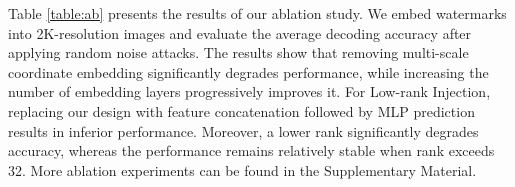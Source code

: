 \documentclass{article}
\begin{document}
Table \ref{table:ab} presents the results of our ablation study. We embed watermarks into 2K-resolution images and evaluate the average decoding accuracy after applying random noise attacks. The results show that removing multi-scale coordinate embedding significantly degrades performance, while increasing the number of embedding layers progressively improves it. For Low-rank Injection, replacing our design with feature concatenation followed by MLP prediction results in inferior performance. Moreover, a lower rank significantly degrades accuracy, whereas the performance remains relatively stable when rank exceeds 32. More ablation experiments can be found in the Supplementary Material.


\begin{table}[]
    \centering
\renewcommand\arraystretch{1.2}
\caption{Model performance with different components. Here, "\faTimes" indicates the absence of the corresponding component. For Coordinates Embedding, this means that only the Coordinate Fourier Mapper is used as an embedding feature. For Low-rank Injection, it signifies that features are concatenated and directly predicted by an MLP.}
\label{table:ab}
\vspace{-0pt}
\end{table}
\end{document}
